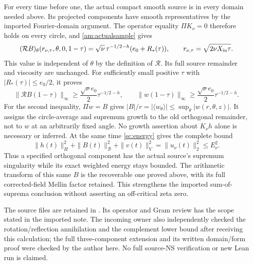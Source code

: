 For every time before one, the actual compact smooth source is in
every domain needed above. Its projected components have smooth
representatives by the imported Fourier-domain argument. The
operator equality $\Pi K_\nu=0$ therefore holds on every circle,
and \eqref{am:actualsample} gives
\[
 (\mathcal RB)_\theta
       (r_{\nu,\tau},\theta,0,1-\tau)
   =\sqrt\nu\,\tau^{-1/2-h}(e_0+R_*(\tau)),
 \qquad r_{\nu,\tau}=\sqrt{2\nu X_{\rm in}\tau}.
\]
This value is independent of $\theta$ by the definition of
$\mathcal R$. Its full source remainder and viscosity are unchanged.
For sufficiently small positive $\tau$ with
$|R_*(\tau)|\leq e_0/2$, it proves
\begin{equation}
 \|\mathcal RB(1-\tau)\|_\infty
       \geq\frac{\sqrt\nu e_0}{2}\tau^{-1/2-h},
 \qquad
 \|w(1-\tau)\|_\infty
       \geq\frac{\sqrt\nu e_0}{2}\tau^{-1/2-h}.
 \label{sc:componentgrowth}
\end{equation}
For the second inequality, $\Pi w=B$ gives
$|B|/r=|\langle w_\theta\rangle|
             \leq\sup_\theta|w(r,\theta,z)|$.
It assigns the circle-average and supremum growth to the old
orthogonal remainder, not to $w$ at an arbitrarily fixed angle.
No growth assertion about $K_\nu h$ alone is necessary or inferred.
At the same time \eqref{sc:energy} gives the complete bound
\[
 \|h(t)\|_H^2+\|B(t)\|_{\mathcal B}^2+\|v(t)\|_V^2
        =\|u_\nu(t)\|_2^2\leq E_\nu^2.
\]
Thus a specified orthogonal component has the actual source's
supremum singularity while its exact weighted energy stays bounded.
The arithmetic transform of this same $B$ is the recoverable one
proved above, with its full corrected-field Mellin factor retained.
This strengthens the imported sum-of-suprema conclusion without
asserting an off-critical zeta zero.

The source files are retained in
. Its operator and Gram
review has the scope stated in the imported note. The incoming owner
also independently checked the rotation/reflection annihilation and
the complement lower bound after receiving this calculation; the
full three-component extension and its written domain/form proof
were checked by the author here. No full source-NS verification or
new Lean run is claimed.

